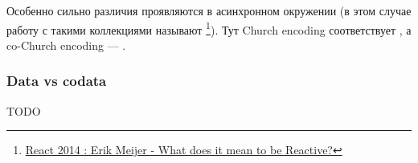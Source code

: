 Особенно сильно различия проявляются в асинхронном окружении (в этом случае работу с такими коллекциями называют \footnote{\href{https://youtu.be/sTSQlYX5DU0?si=Xhfi62ScXHBBjdBx}{React 2014 : Erik Meijer - What does it mean to be Reactive?}}).
Тут Church encoding соответствует , а co-Church encoding --- . %

\subsubsection{Data vs codata} \label{subsubsec:data-codata}

%
%

TODO~\cite{downen2019codata} %



